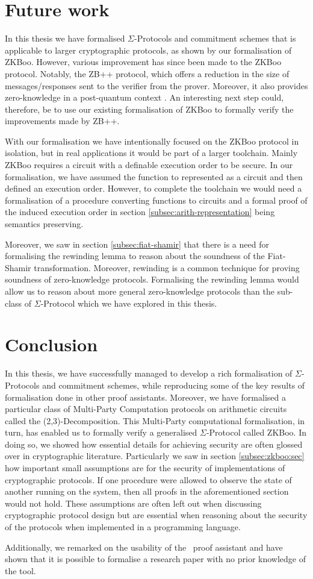 \section{Future work}
\label{sec:future_work}
In this thesis we have formalised $\Sigma$-Protocols and
commitment schemes that is applicable to larger cryptographic protocols, as shown
by our formalisation of ZKBoo. However, various improvement has since been made to the
ZKBoo protocol. Notably, the ZB++ protocol, which offers a reduction in the
size of messages/responses sent to the verifier from the prover. Moreover, it also provides zero-knowledge
in a post-quantum context \cite{zkb++}. An interesting next step could,
therefore, be to use our existing formalisation of ZKBoo to formally verify the
improvements made by ZB++.

With our formalisation we have intentionally focused on the ZKBoo protocol in
isolation, but in real applications it would be part of a larger toolchain.
Mainly ZKBoo requires a circuit with a definable execution order to be secure.
In our formalisation, we have assumed the function to represented as a circuit
and then defined an execution order. However, to complete the toolchain we would need a formalisation of
a procedure converting functions to circuits and a formal proof of the induced
execution order in section \ref{subsec:arith-representation} being semantics preserving.

Moreover, we saw in section \ref{subsec:fiat-shamir} that there is a need for
formalising the rewinding lemma to reason about the soundness of the Fiat-Shamir
transformation. Moreover, rewinding is a common technique for proving soundness
of zero-knowledge protocols. Formalising the rewinding lemma would allow
us to reason about more general zero-knowledge protocols than the sub-class of
$\Sigma$-Protocol which we have explored in this thesis.

\section{Conclusion}
\label{sec:conclusion}
In this thesis, we have successfully managed to develop a rich formalisation of
$\Sigma$-Protocols and commitment schemes, while reproducing some of the key
results of formalisation done in other proof assistants.
Moreover, we have formalised a particular class of Multi-Party Computation
protocols on arithmetic circuits called the (2,3)-Decomposition.
This Multi-Party computational formalisation, in turn, has enabled us to formally
verify a generalised $\Sigma$-Protocol called ZKBoo.
In doing so, we showed how essential details for achieving security are
often glossed over in cryptographic literature.
Particularly we saw in section \ref{subsec:zkboo:sec} how important small
assumptions are for the security of implementations of cryptographic protocols.
If one procedure were allowed to observe the state of another running on the
system, then all proofs in the aforementioned section would not hold. These
assumptions are often left out when discussing cryptographic protocol design
but are essential when reasoning about the security of the protocols when
implemented in a programming language.

Additionally, we remarked on the usability of the \easycrypt\ proof
assistant and have shown that it is possible to formalise a research paper with
no prior knowledge of the tool.

